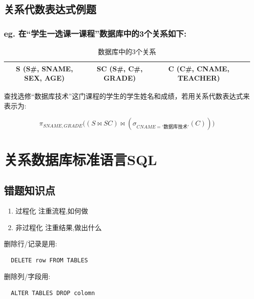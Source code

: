 \documentclass[a4paper,12pt,UTF8,fontset=none]{ctexart}
\begin{document}
\subsection{关系代数表达式例题}
\subsubsection*{eg. 在“学生一选课一课程”数据库中的3个关系如下:}

\begin{table}[H]
\centering
\caption{数据库中的3个关系}
\begin{tabular}{c c c c}
\toprule
S (S\#, SNAME, SEX, AGE) & SC (S\#, C\#, GRADE) & C (C\#, CNAME, TEACHER) \\
\midrule
\end{tabular}

\end{table}

查找选修“数据库技术”这门课程的学生的学生姓名和成绩，若用关系代数表达式来表示为:

\begin{equation*}%
\pi_{SNAME,GRADE} \big((S \bowtie SC )\bowtie (\sigma_{CNAME='\text{数据库技术}'} (C))\big) 
\end{equation*}
\newpage
\section{关系数据库标准语言SQL}
\subsection{错题知识点}
\begin{enumerate}
  \item 过程化
  注重流程,如何做
  \item 非过程化
  注重结果,做出什么
\end{enumerate}
删除行/记录是用:
\begin{lstlisting}
  DELETE row FROM TABLES
\end{lstlisting}
删除列/字段用:
\begin{lstlisting}
  ALTER TABLES DROP colomn
\end{lstlisting}
\end{document}
